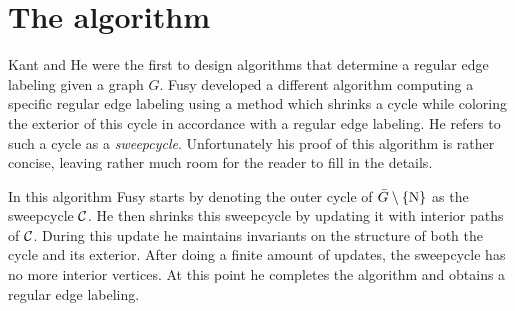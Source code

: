 
\section{The algorithm}
\thispagestyle{plain}
\label{s:algo}

  Kant and He \cite{Kant1997} were the first to design algorithms that determine a regular edge labeling given a graph $G$. Fusy \cite{Fusy2006} developed a different algorithm computing a specific regular edge labeling using a method which shrinks a cycle while coloring the exterior of this cycle in accordance with a regular edge labeling.
  He refers to such a cycle as a \emph{sweepcycle}.
  Unfortunately his proof of this algorithm is rather concise, leaving rather much room for the reader to fill in the details.

  In this algorithm Fusy starts by denoting the outer cycle of $\bar{G} \setminus \left\lbrace {\mathrm{N}} \right\rbrace$ as the sweepcycle $\mathcal{C}$. He then shrinks this sweepcycle by updating it with interior paths of $\mathcal{C}$. During this update he maintains invariants on the structure of both the cycle and its exterior.
  After doing a finite amount of updates, the sweepcycle has no more interior vertices. At this point he completes the algorithm and obtains a regular edge labeling.

